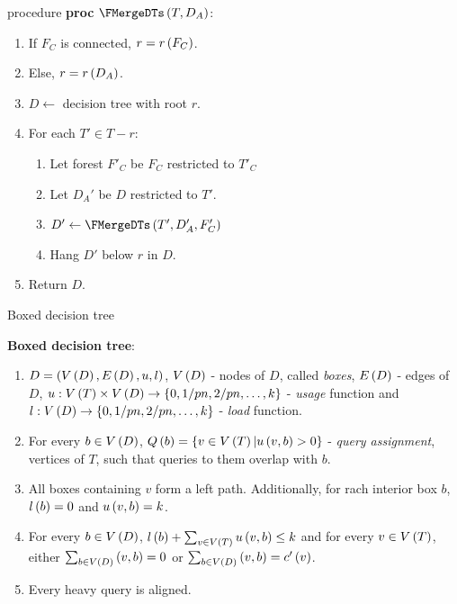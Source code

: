 % 
\begin{frame}{\FMergeDTs procedure}
\textbf{proc} $\FMergeDTs\br{T, D_A}$:
\begin{enumerate}
    \item If $F_C$ is connected, $r=r\left( F_C \right)$.
    \item Else, $r=r\left( D_A \right)$.
    \item $D\gets$ decision tree with root $r$.
    \item For each $T'\in T-r$:
    \begin{enumerate}
        \item Let forest $F'_C$ be $F_C$ restricted to $T'_C$
        \item Let $D_A'$ be $D$ restricted to $T'$.
        \item $D'\gets \FMergeDTs\br{T', D_A', F'_C}$
        \item Hang $D'$ below $r$ in $D$.
    \end{enumerate}  
    \item Return $D$.
\end{enumerate}
\end{frame}
\begin{frame}{Boxed decision tree}
    \begin{definition}
        \textbf{Boxed decision tree}:
        \begin{enumerate}
        \item $D=\left( V\left( D \right), E\left( D \right), u, l \right)$, $V\left( D \right)$ - nodes of $D$, called \textit{boxes}, $E\left( D \right)$ - edges of $D$, $u:V\left( T \right)\times V\left( D \right)\to \left\{ 0, 1/pn,2/pn,\dots,k \right\}$ - \textit{usage} function and $l:V\left( D \right)\to\left\{ 0, 1/pn,2/pn,\dots,k \right\}$ - \textit{load} function.
        \pause
        \item For every $b\in V\left( D \right)$, $Q\left( b \right)=\left\{ v\in V\left( T \right)|u\left( v,b \right)>0 \right\}$ - \textit{query assignment}, vertices of $T$, such that queries to them overlap with $b$.
        \pause
        \item All boxes containing $v$ form a left path. Additionally, for rach interior box $b$, $l\left( b \right)=0$ and $u\left( v,b \right)=k$.
        \pause
        \item For every $b\in V\left( D \right)$, $l\left( b \right)+\sum_{v\in V\left( T \right)}u\left( v,b \right)\leq k$ and for every $v\in V\left( T \right)$, either $\sum_{b\in V\left( D \right)}\left( v,b \right)=0$ or $\sum_{b\in V\left( D \right)}\left( v,b \right)=c'\left( v \right)$.
        \pause
        \item Every heavy query is aligned.
        \end{enumerate}  
    \end{definition}
\end{frame}
